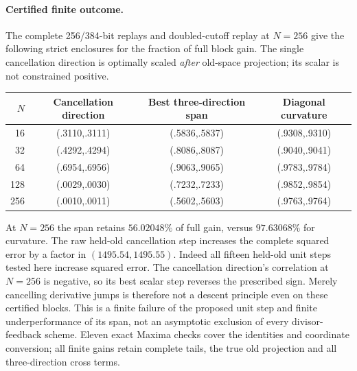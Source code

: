 \paragraph{Certified finite outcome.}
The complete 256/384-bit replays and doubled-cutoff replay at $N=256$
give the following strict enclosures for the fraction of full block gain.
The single cancellation direction is optimally scaled \emph{after} old-space
projection; its scalar is not constrained positive.
\begin{center}
\begin{tabular}{rccc}
\hline
$N$&Cancellation direction&Best three-direction span&Diagonal curvature\\
\hline
16&(.3110,.3111)&(.5836,.5837)&(.9308,.9310)\\
32&(.4292,.4294)&(.8086,.8087)&(.9040,.9041)\\
64&(.6954,.6956)&(.9063,.9065)&(.9783,.9784)\\
128&(.0029,.0030)&(.7232,.7233)&(.9852,.9854)\\
256&(.0010,.0011)&(.5602,.5603)&(.9763,.9764)\\
\hline
\end{tabular}
\end{center}
At $N=256$ the span retains $56.02048\%$ of full gain, versus
$97.63068\%$ for curvature. The raw held-old cancellation step increases
the complete squared error by a factor in $(1495.54,1495.55)$.
Indeed all fifteen held-old unit steps tested here increase squared error.
The cancellation direction's correlation at $N=256$ is negative, so its
best scalar step reverses the prescribed sign. Merely cancelling derivative
jumps is therefore not a descent principle even on these certified blocks.
This is a finite failure of the proposed unit step and finite underperformance
of its span, not an asymptotic exclusion of every divisor-feedback scheme.
Eleven exact Maxima checks cover the identities and coordinate conversion;
all finite gains retain complete tails, the true old projection and all
three-direction cross terms.
